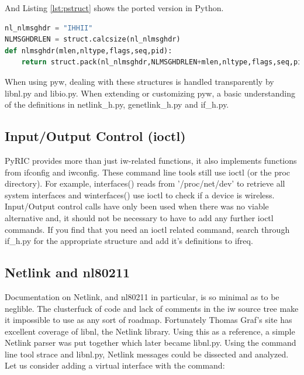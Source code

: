 \documentclass[11pt]{article}
\begin{document}
And Listing \ref{lst:pstruct} shows the ported version in Python.

\begin{lstlisting}[caption={Corresponding Python Definition},
                   label={lst:pstruct},
                   language=Python]
nl_nlmsghdr = "IHHII"
NLMSGHDRLEN = struct.calcsize(nl_nlmsghdr)
def nlmsghdr(mlen,nltype,flags,seq,pid):
    return struct.pack(nl_nlmsghdr,NLMSGHDRLEN+mlen,nltype,flags,seq,pid)
\end{lstlisting}

When using pyw, dealing with these structures is handled transparently by libnl.py 
and libio.py. When extending or customizing pyw, a basic understanding of the 
definitions in netlink\_h.py, genetlink\_h.py and if\_h.py.

\subsection{Input/Output Control (ioctl)}
PyRIC provides more than just iw-related functions, it also implements functions
from ifconfig and iwconfig. These command line tools still use ioctl (or the proc
directory). For example, interfaces() reads from '/proc/net/dev' to retrieve all
system interfaces and winterfaces() use ioctl to check if a device is wireless.
Input/Output control calls have only been used when there was no viable alternative 
and, it should not be necessary to have to add any further ioctl commands. If you
find that you need an ioctl related command, search through if\_h.py for the 
appropriate structure and add it's definitions to ifreq. 

\subsection{Netlink and nl80211}
Documentation on Netlink, and nl80211 in particular, is so minimal as to be 
neglible. The clusterfuck of code and lack of comments in the iw source tree 
make it impossible to use as any sort of roadmap. Fortunately Thomas Graf's 
site\cite{libnl} has excellent coverage of libnl, the Netlink library. Using 
this as a reference, a simple Netlink parser was put together which later became
libnl.py. Using the command line tool strace and libnl.py, Netlink messages could
be dissected and analyzed.\\

Let us consider adding a virtual interface with the command:\\
\end{document}

